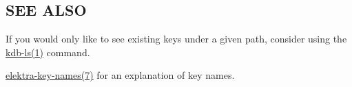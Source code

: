 \subsection*{S\+EE A\+L\+SO}


\begin{DoxyItemize}
\item If you would only like to see existing keys under a given path, consider using the \hyperlink{doc_help_kdb-ls_md}{kdb-\/ls(1)} command.
\item \hyperlink{doc_help_elektra-key-names_md}{elektra-\/key-\/names(7)} for an explanation of key names. 
\end{DoxyItemize}